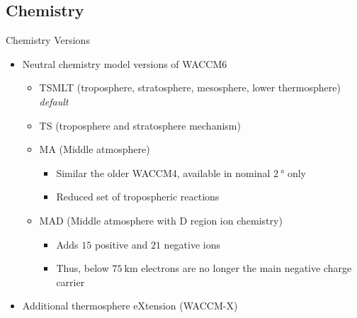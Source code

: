 \documentclass[xcolor=dvipsnames]{beamer} %
\begin{document}
\subsection{Chemistry}
\begin{frame}{Chemistry Versions}
	\begin{itemize}[<+->]
		\item Neutral chemistry model versions of WACCM6
		      \begin{itemize}
			      \item TSMLT (troposphere, stratosphere, mesosphere, lower thermosphere) \textit{default}
			      \item TS (troposphere and stratosphere mechanism)
			      \item MA (Middle atmosphere)\begin{itemize}
				            \item Similar the older WACCM4, available in nominal $ \SI{2}{\degree} $ only %
				            \item Reduced set of tropospheric reactions
			            \end{itemize}
			      \item MAD (Middle atmosphere with D region ion chemistry)
			            \begin{itemize}
				            \item Adds $ 15 $ positive and $ 21 $ negative ions %
				            \item Thus, below $ \SI{75}{\kilo\metre} $ electrons are no longer the main
				                  negative charge carrier %
			            \end{itemize}
		      \end{itemize}
		\item Additional thermosphere eXtension (WACCM-X)
	\end{itemize}
\end{frame}
\end{document}
